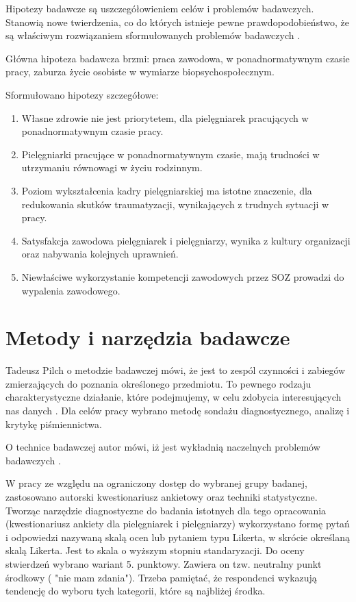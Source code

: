 \documentclass[a4paper,12pt,twoside,openright]{mwrep}
\begin{document}
Hipotezy badawcze są uszczegółowieniem celów i problemów badawczych. Stanowią nowe twierdzenia, co do których istnieje pewne prawdopodobieństwo, że są właściwym rozwiązaniem sformułowanych problemów badawczych \cite{janusz}.

Główna hipoteza badawcza brzmi: praca zawodowa, w ponadnormatywnym czasie pracy, zaburza życie osobiste w wymiarze biopsychospołecznym.

Sformułowano hipotezy szczegółowe:
\begin{enumerate}
	\item Własne zdrowie nie jest priorytetem, dla pielęgniarek pracujących w ponadnormatywnym czasie pracy.
	\item Pielęgniarki pracujące w ponadnormatywnym czasie, mają  trudności w utrzymaniu równowagi w życiu  rodzinnym. 
	\item Poziom wykształcenia kadry pielęgniarskiej ma istotne znaczenie, dla redukowania skutków traumatyzacji, wynikających z trudnych sytuacji w pracy.
	\item Satysfakcja zawodowa pielęgniarek i pielęgniarzy, wynika z kultury organizacji oraz nabywania kolejnych uprawnień.
	\item Niewłaściwe wykorzystanie kompetencji zawodowych przez SOZ prowadzi do wypalenia zawodowego.
\end{enumerate}

\section{Metody i narzędzia badawcze}
Tadeusz Pilch o metodzie badawczej mówi, że jest to zespól czynności i zabiegów zmierzających do poznania określonego przedmiotu. To pewnego rodzaju charakterystyczne działanie, które podejmujemy, w celu zdobycia interesujących nas danych \cite{tadeusz}. Dla celów pracy wybrano metodę sondażu diagnostycznego, analizę i krytykę piśmiennictwa.\cite{krys}

O technice badawczej autor mówi, iż jest wykładnią naczelnych problemów badawczych \cite{tadeusz}. 

W pracy ze względu na ograniczony dostęp do wybranej grupy badanej, zastosowano autorski kwestionariusz ankietowy oraz techniki statystyczne.
Tworząc narzędzie diagnostyczne do badania istotnych dla tego opracowania (kwestionariusz ankiety dla pielęgniarek i pielęgniarzy) wykorzystano formę pytań i odpowiedzi nazywaną skalą ocen lub pytaniem typu Likerta, w skrócie określaną skalą Likerta. Jest to skala o wyższym stopniu standaryzacji. Do oceny stwierdzeń wybrano wariant 5. punktowy. Zawiera on tzw. neutralny punkt środkowy ( "nie mam zdania"). Trzeba pamiętać, że respondenci wykazują tendencję do wyboru tych kategorii, które są najbliżej środka.
\end{document}
